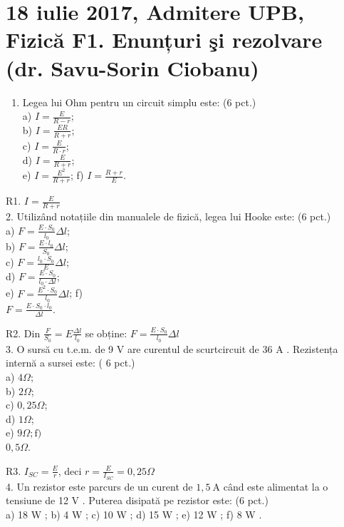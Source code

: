 \section*{18 iulie 2017, Admitere UPB, Fizică F1. Enunțuri şi rezolvare (dr. Savu-Sorin Ciobanu)}
\begin{enumerate}
  \item Legea lui Ohm pentru un circuit simplu este: (6 pct.)\\
a) $I=\frac{E}{R-r}$;\\
b) $I=\frac{E R}{R+r}$;\\
c) $I=\frac{E}{R \cdot r}$;\\
d) $I=\frac{E}{R+r}$;\\
e) $I=\frac{E^{2}}{R+r}$; f) $I=\frac{R+r}{E}$.
\end{enumerate}

R1. $I=\frac{E}{R+r}$\\
2. Utilizând notațiile din manualele de fizică, legea lui Hooke este: (6 pct.)\\
a) $F=\frac{E \cdot S_{0}}{l_{0}} \Delta l$;\\
b) $F=\frac{E \cdot l_{0}}{S_{0}} \Delta l$;\\
c) $F=\frac{l_{0} \cdot S_{0}}{E} \Delta l$;\\
d) $F=\frac{E \cdot S_{0}}{l_{0} \cdot \Delta l}$;\\
e) $F=\frac{E^{2} \cdot S_{0}}{l_{0}} \Delta l$; f)\\
$F=\frac{E \cdot S_{0} \cdot l_{0}}{\Delta l}$.

R2. Din $\frac{F}{S_{0}}=E \frac{\Delta l}{l_{0}}$ se obține: $F=\frac{E \cdot S_{0}}{l_{0}} \Delta l$\\
3. O sursă cu t.e.m. de 9 V are curentul de scurtcircuit de 36 A . Rezistența internă a sursei este: ( 6 pct.)\\
a) $4 \Omega$;\\
b) $2 \Omega$;\\
c) $0,25 \Omega$;\\
d) $1 \Omega$;\\
e) $9 \Omega ; \mathrm{f})$\\
$0,5 \Omega$.

R3. $I_{S C}=\frac{E}{r}$, deci $r=\frac{E}{I_{S C}}=0,25 \Omega$\\
4. Un rezistor este parcurs de un curent de $1,5 \mathrm{~A}$ când este alimentat la o tensiune de 12 V . Puterea disipată pe rezistor este: (6 pct.)\\
a) 18 W ; b) 4 W ; c) 10 W ; d) 15 W ; e) 12 W ; f) 8 W .


